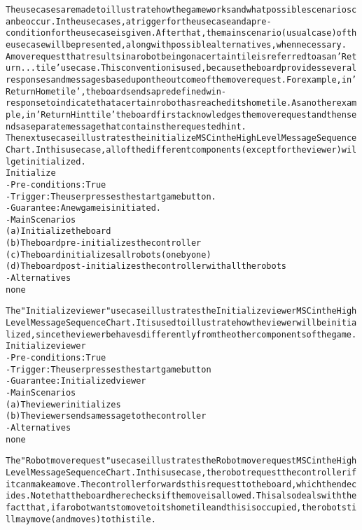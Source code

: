\begin{alltt}
\rm
The use cases are made to illustrate how the game works and what possible scenarios can be occur. In the use cases, a trigger for the use case and a pre-condition for the use case is given. After that, the main scenario (usual case) of the use case will be presented, along with possible alternatives, when necessary. \\
A move request that results in a robot being on a certain tile is referred to as an 'Return ... tile' use case. This convention is used, because the board provides several responses and messages based upon the outcome of the move request. For example, in 'Return Home tile', the board sends a predefined win-response to indicate that a certain robot has reached its home tile. As another example, in 'Return Hint tile' the board first acknowledges the move request and then sends a separate message that contains the requested hint. \\

The next use case illustrates the initialize MSC in the High Level Message Sequence Chart. In this use case, all of the different components (except for the viewer) will get initialized. \\

Initialize
- Pre-conditions: True
- Trigger: The user presses the start game button.
- Guarantee: A new game is initiated.
- Main Scenarios
    (a) Initialize the board
    (b) The board pre-initializes the controller
    (c) The board initializes all robots (one by one)
    (d) The board post-initializes the controller with all the robots
- Alternatives \\
    none
    
The "Initialize viewer" use case illustrates the Initialize viewer MSC in the High Level Message Sequence Chart. It is used to illustrate how the viewer will be initialized, since the viewer behaves differently from the other components of the game. \\

Initialize viewer
- Pre-conditions: True
- Trigger: The user presses the start game button
- Guarantee: Initialized viewer
- Main Scenarios
    (a) The viewer initializes
    (b) The viewer sends a message to the controller
- Alternatives \\
    none

The "Robot move request" use case illustrates the Robot move request MSC in the High Level Message Sequence Chart. In this use case, the robot request the controller if it can make a move. The controller forwards this request to the board, which then decides. Note that the board here checks if the move is allowed. This also deals with the fact that, if a robot wants to move to its home tile and this is occupied, the robot still may move (and moves) to this tile. \\


\end{alltt}
